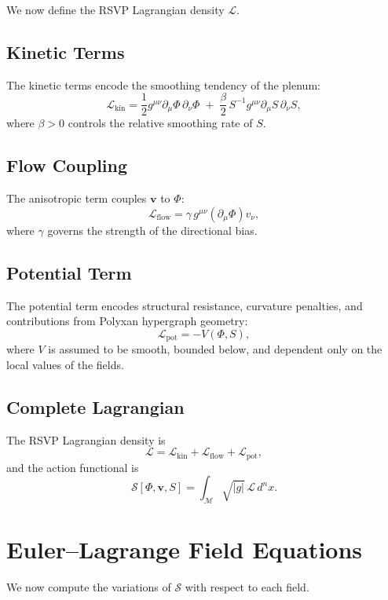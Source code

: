 We now define the RSVP Lagrangian density $\mathcal{L}$.

\subsection{Kinetic Terms}

The kinetic terms encode the smoothing tendency of the plenum:
\[
\mathcal{L}_{\mathrm{kin}}
=
\frac{1}{2} g^{\mu\nu} \partial_\mu \Phi \, \partial_\nu \Phi
\;+\;
\frac{\beta}{2} \, S^{-1} g^{\mu\nu} \partial_\mu S \, \partial_\nu S ,
\]
where $\beta > 0$ controls the relative smoothing rate of $S$.

\subsection{Flow Coupling}

The anisotropic term couples $\mathbf{v}$ to $\Phi$:
\[
\mathcal{L}_{\mathrm{flow}}
=
\gamma \, g^{\mu\nu} (\partial_\mu \Phi) v_\nu ,
\]
where $\gamma$ governs the strength of the directional bias.

\subsection{Potential Term}

The potential term encodes structural resistance, curvature penalties, and
contributions from Polyxan hypergraph geometry:
\[
\mathcal{L}_{\mathrm{pot}}
= - V(\Phi,S),
\]
where $V$ is assumed to be smooth, bounded below, and dependent only on the
local values of the fields.

\subsection{Complete Lagrangian}

\begin{definition}
The RSVP Lagrangian density is
\[
\mathcal{L}
=
\mathcal{L}_{\mathrm{kin}}
+
\mathcal{L}_{\mathrm{flow}}
+
\mathcal{L}_{\mathrm{pot}},
\]
and the action functional is
\[
\mathcal{S}[\Phi,\mathbf{v},S]
=
\int_{\mathcal{M}}
\sqrt{|g|} \, \mathcal{L} \, d^n x.
\]
\end{definition}

\section{Euler--Lagrange Field Equations}

We now compute the variations of $\mathcal{S}$ with respect to each field.


